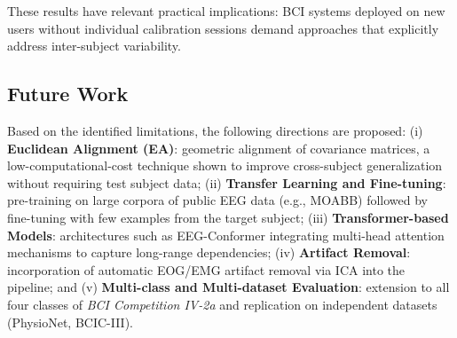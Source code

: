 \documentclass[conference]{IEEEtran}
\begin{document}
These results have relevant practical implications: BCI systems deployed on new users without individual calibration sessions demand approaches that explicitly address inter-subject variability.

\subsection{Future Work}

Based on the identified limitations, the following directions are proposed: (i) \textbf{Euclidean Alignment (EA)}: geometric alignment of covariance matrices, a low-computational-cost technique shown to improve cross-subject generalization without requiring test subject data; (ii) \textbf{Transfer Learning and Fine-tuning}: pre-training on large corpora of public EEG data (e.g., MOABB) followed by fine-tuning with few examples from the target subject; (iii) \textbf{Transformer-based Models}: architectures such as EEG-Conformer integrating multi-head attention mechanisms to capture long-range dependencies; (iv) \textbf{Artifact Removal}: incorporation of automatic EOG/EMG artifact removal via ICA into the pipeline; and (v) \textbf{Multi-class and Multi-dataset Evaluation}: extension to all four classes of \textit{BCI Competition IV-2a} and replication on independent datasets (PhysioNet, BCIC-III).


\end{document}
